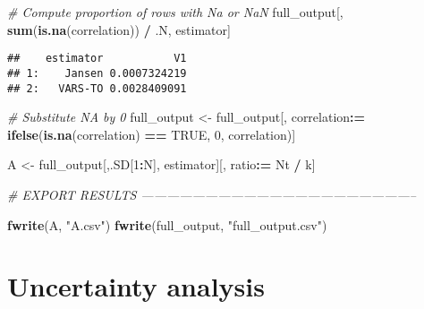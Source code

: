 \documentclass[11pt,]{article}
\newenvironment{Shaded}{\begin{snugshade}}{\end{snugshade}}
\newcommand{\CommentTok}[1]{\textcolor[rgb]{0.56,0.35,0.01}{\textit{#1}}}
\newcommand{\DecValTok}[1]{\textcolor[rgb]{0.00,0.00,0.81}{#1}}
\newcommand{\ErrorTok}[1]{\textcolor[rgb]{0.64,0.00,0.00}{\textbf{#1}}}
\newcommand{\KeywordTok}[1]{\textcolor[rgb]{0.13,0.29,0.53}{\textbf{#1}}}
\newcommand{\NormalTok}[1]{#1}
\newcommand{\OperatorTok}[1]{\textcolor[rgb]{0.81,0.36,0.00}{\textbf{#1}}}
\newcommand{\OtherTok}[1]{\textcolor[rgb]{0.56,0.35,0.01}{#1}}
\newcommand{\StringTok}[1]{\textcolor[rgb]{0.31,0.60,0.02}{#1}}
\begin{document}
\begin{Shaded}
\begin{Highlighting}[]
\CommentTok{# Compute proportion of rows with Na or NaN}
\NormalTok{full_output[, }\KeywordTok{sum}\NormalTok{(}\KeywordTok{is.na}\NormalTok{(correlation)) }\OperatorTok{/}\StringTok{ }\NormalTok{.N, estimator]}
\end{Highlighting}
\end{Shaded}

\begin{verbatim}
##    estimator           V1
## 1:    Jansen 0.0007324219
## 2:   VARS-TO 0.0028409091
\end{verbatim}

\begin{Shaded}
\begin{Highlighting}[]
\CommentTok{# Substitute NA by 0}
\NormalTok{full_output <-}\StringTok{ }\NormalTok{full_output[, correlation}\OperatorTok{:}\ErrorTok{=}\StringTok{ }\KeywordTok{ifelse}\NormalTok{(}\KeywordTok{is.na}\NormalTok{(correlation) }\OperatorTok{==}\StringTok{ }\OtherTok{TRUE}\NormalTok{, }\DecValTok{0}\NormalTok{, correlation)]}

\NormalTok{A <-}\StringTok{ }\NormalTok{full_output[,.SD[}\DecValTok{1}\OperatorTok{:}\NormalTok{N], estimator][, ratio}\OperatorTok{:}\ErrorTok{=}\StringTok{ }\NormalTok{Nt }\OperatorTok{/}\StringTok{ }\NormalTok{k]}
\end{Highlighting}
\end{Shaded}

\begin{Shaded}
\begin{Highlighting}[]
\CommentTok{# EXPORT RESULTS -----------------------------------------------------------------}

\KeywordTok{fwrite}\NormalTok{(A, }\StringTok{"A.csv"}\NormalTok{)}
\KeywordTok{fwrite}\NormalTok{(full_output, }\StringTok{"full_output.csv"}\NormalTok{)}
\end{Highlighting}
\end{Shaded}

\hypertarget{uncertainty-analysis}{%
\section{Uncertainty analysis}\label{uncertainty-analysis}}
\end{document}
